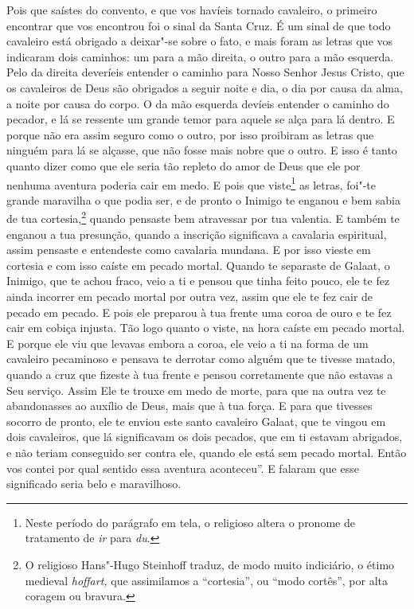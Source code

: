 Pois que saístes do convento, e que vos havíeis tornado cavaleiro, o primeiro
encontrar que vos encontrou foi o sinal da Santa Cruz. É um sinal de que todo
cavaleiro está obrigado a deixar"-se sobre o fato, e mais foram as letras que
vos indicaram dois caminhos: um para a mão direita, o outro para a mão esquerda.
Pelo da direita deveríeis entender o caminho para Nosso Senhor Jesus Cristo,
que os cavaleiros de Deus são obrigados a seguir noite e dia, o dia por causa
da alma, a noite por causa do corpo. O da mão esquerda devíeis entender o
caminho do pecador, e lá se ressente um grande temor para aquele se alça para
lá dentro. E porque não era assim seguro como o outro, por isso proibiram as
letras que ninguém para lá se alçasse, que não fosse mais nobre que o outro. E
isso é tanto quanto dizer como que ele seria tão repleto do amor de Deus que
ele por nenhuma aventura poderia cair em medo. E pois que viste\footnote{ Neste
período do parágrafo em tela, o religioso altera o pronome de tratamento de
\textit{ir}  para \textit{du}.}  as letras, foi"-te
grande maravilha o que podia ser, e de pronto o Inimigo te enganou e bem sabia
de tua cortesia,\footnote{ O religioso Hans"-Hugo Steinhoff traduz, de modo muito
indiciário, o étimo medieval \textit{hoffart,} que assimilamos a “cortesia”, ou
 “modo cortês”, por alta coragem ou bravura.}  quando
pensaste bem atravessar por tua valentia. E também te enganou a tua presunção,
quando a inscrição significava a cavalaria espiritual, assim pensaste e
entendeste como cavalaria mundana. E por isso vieste em cortesia e com isso
caíste em pecado mortal. Quando te separaste de Galaat, o Inimigo, que te achou
fraco, veio a ti e pensou que tinha feito pouco, ele te fez ainda incorrer em
pecado mortal por outra vez, assim que ele te fez cair de pecado em pecado. E
pois ele preparou à tua frente uma coroa de ouro e te fez cair em cobiça
injusta. Tão logo quanto o viste, na hora caíste em pecado mortal. E porque ele
viu que levavas embora a coroa, ele veio a ti na forma de um cavaleiro
pecaminoso e pensava te derrotar como alguém que te tivesse matado, quando a cruz
que fizeste à tua frente e pensou corretamente que não estavas a Seu serviço.
Assim Ele te trouxe em medo de morte, para que na outra vez te abandonasses ao
auxílio de Deus, mais que à tua força. E para que tivesses socorro de pronto,
ele te enviou este santo cavaleiro Galaat, que te vingou em dois cavaleiros,
que lá significavam os dois pecados, que em ti estavam abrigados, e não teriam
conseguido ser contra ele, quando ele está sem pecado mortal. Então vos contei
por qual sentido essa aventura aconteceu”. E falaram que esse
significado seria belo e maravilhoso.

